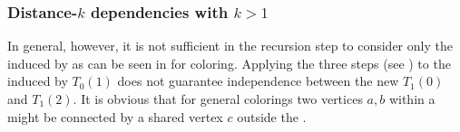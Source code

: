 	\subsubsection{Distance-$k$ dependencies with $k>1$}  \label{subsec:Dk_dependency}
In general, however, it is not sufficient in the recursion step to consider only the \subgraphs induced by \levelGroups as can be seen in  for \DTWO coloring. Applying  the three steps (see )  to  the \subgraph induced by $T_0(1)$ does not guarantee \DTWO independence between the new \levelGroups $T_1(0)$ and $T_1(2)$. It is obvious that for general \DK colorings two vertices $a,b$ within a \levelGroup might be connected by a shared vertex $c$ outside the \levelGroup. 
